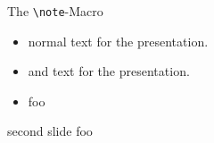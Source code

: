 \documentclass{beamer}
\begin{document}
\begin{frame}{The \texttt{\textbackslash note}-Macro}
\begin{itemize}[<+->]
\item normal text for the presentation.
\item and text for the presentation.
\item foo
\end{itemize}
\end{frame}


\begin{frame}{second slide} 
foo 
\end{frame}
\end{document}
